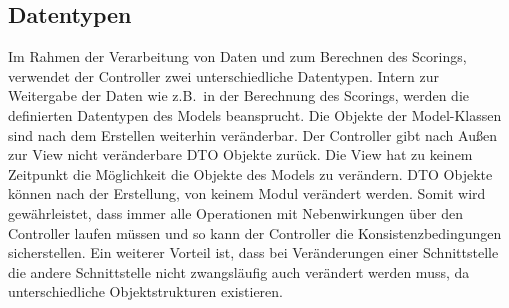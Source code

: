 \subsection{Datentypen}\label{subsec:datentypen}
Im Rahmen der Verarbeitung von Daten und zum Berechnen des Scorings, verwendet der Controller zwei unterschiedliche Datentypen.
Intern zur Weitergabe der Daten wie z.B.\ in der Berechnung des Scorings, werden die definierten Datentypen des Models beansprucht.
Die Objekte der Model-Klassen sind nach dem Erstellen weiterhin veränderbar.
Der Controller gibt nach Außen zur View nicht veränderbare DTO Objekte zurück.
Die View hat zu keinem Zeitpunkt die Möglichkeit die Objekte des Models zu verändern.
DTO Objekte können nach der Erstellung, von keinem Modul verändert werden.
Somit wird gewährleistet,
dass immer alle Operationen mit Nebenwirkungen über den Controller laufen müssen und so kann der Controller
die Konsistenzbedingungen sicherstellen.
Ein weiterer Vorteil ist,
dass bei Veränderungen einer Schnittstelle die andere Schnittstelle nicht zwangsläufig auch verändert
werden muss, da unterschiedliche Objektstrukturen existieren.

